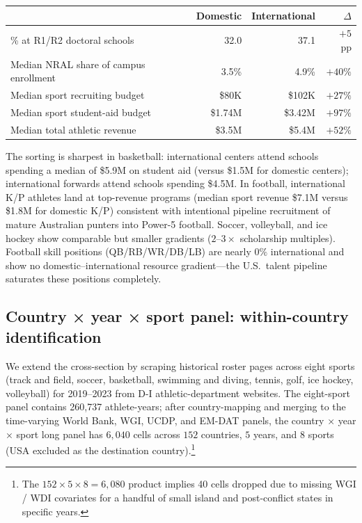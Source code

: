 \documentclass[11pt]{article}
\begin{document}
\begin{center}
\small
\begin{tabular}{lrrr}
\toprule
                                          & Domestic & International & $\Delta$ \\
\midrule
\% at R1/R2 doctoral schools              & 32.0 & 37.1 & $+5$ pp \\
Median NRAL share of campus enrollment    & 3.5\% & 4.9\% & $+40\%$ \\
Median sport recruiting budget            & \$80K  & \$102K & $+27\%$ \\
Median sport student-aid budget           & \$1.74M & \$3.42M & $+97\%$ \\
Median total athletic revenue             & \$3.5M  & \$5.4M  & $+52\%$ \\
\bottomrule
\end{tabular}
\end{center}

The sorting is sharpest in basketball: international centers attend
schools spending a median of \$5.9M on student aid (versus \$1.5M
for domestic centers); international forwards attend schools
spending \$4.5M. In football, international K/P athletes land at
top-revenue programs (median sport revenue \$7.1M versus \$1.8M for
domestic K/P) consistent with intentional pipeline recruitment of
mature Australian punters into Power-5 football. Soccer, volleyball,
and ice hockey show comparable but smaller gradients ($2$--$3\times$
scholarship multiples). Football skill positions (QB/RB/WR/DB/LB)
are nearly $0\%$ international and show no domestic--international
resource gradient---the U.S.\ talent pipeline saturates these
positions completely.

\subsection{Country × year × sport panel: within-country identification}
\label{sec:panel}

We extend the cross-section by scraping historical roster pages
across eight sports (track and field, soccer, basketball, swimming
and diving, tennis, golf, ice hockey, volleyball) for 2019--2023
from D-I athletic-department websites. The eight-sport panel
contains 260{,}737 athlete-years; after country-mapping and merging
to the time-varying World Bank, WGI, UCDP, and EM-DAT panels, the
country × year × sport long panel has $6{,}040$ cells across $152$
countries, $5$ years, and $8$ sports (USA excluded as the
destination country).\footnote{The $152 \times 5 \times 8 = 6{,}080$
product implies 40 cells dropped due to missing WGI / WDI covariates
for a handful of small island and post-conflict states in specific
years.}
\end{document}
